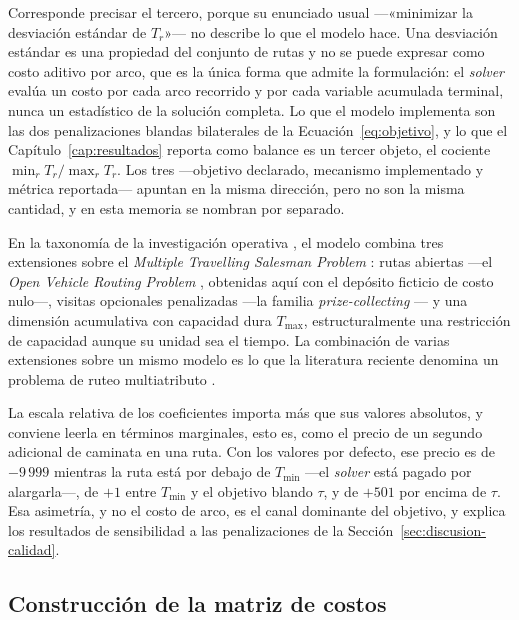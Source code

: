 \begin{enumerate}
Corresponde precisar el tercero, porque su enunciado usual ---«minimizar la desviación estándar de
$T_r$»--- no describe lo que el modelo hace. Una desviación estándar es una propiedad del conjunto
de rutas y no se puede expresar como costo aditivo por arco, que es la única forma que admite la
formulación: el \textit{solver} evalúa un costo por cada arco recorrido y por cada variable
acumulada terminal, nunca un estadístico de la solución completa. Lo que el modelo implementa son
las dos penalizaciones blandas bilaterales de la Ecuación~\ref{eq:objetivo}, y lo que el
Capítulo~\ref{cap:resultados} reporta como balance es un tercer objeto, el cociente
$\min_r T_r / \max_r T_r$. Los tres ---objetivo declarado, mecanismo implementado y métrica
reportada--- apuntan en la misma dirección, pero no son la misma cantidad, y en esta memoria se
nombran por separado.

En la taxonomía de la investigación operativa \citep{toth2014vehicle}, el modelo combina tres
extensiones sobre el \textit{Multiple Travelling Salesman Problem}
\citep{bektas2006multiple,laporte1992traveling}: rutas abiertas ---el \textit{Open Vehicle Routing
Problem} \citep{li2007open}, obtenidas aquí con el depósito ficticio de costo nulo---, visitas
opcionales penalizadas ---la familia \textit{prize-collecting}
\citep{balas1989prize,feillet2005traveling}--- y una dimensión acumulativa con capacidad dura
$T_{\max}$, estructuralmente una restricción de capacidad aunque su unidad sea el tiempo. La
combinación de varias extensiones sobre un mismo modelo es lo que la literatura reciente denomina
un problema de ruteo multiatributo \citep{vidal2013heuristics}.

La escala relativa de los coeficientes importa más que sus valores absolutos, y conviene leerla en
términos marginales, esto es, como el precio de un segundo adicional de caminata en una ruta. Con
los valores por defecto, ese precio es de $-9\,999$ mientras la ruta está por debajo de $T_{\min}$
---el \textit{solver} está pagado por alargarla---, de $+1$ entre $T_{\min}$ y el objetivo blando
$\tau$, y de $+501$ por encima de $\tau$. Esa asimetría, y no el costo de arco, es el canal
dominante del objetivo, y explica los resultados de sensibilidad a las penalizaciones de la
Sección~\ref{sec:discusion-calidad}.

\end{enumerate}

\subsection{Construcción de la matriz de costos}
\label{sec:matriz}

